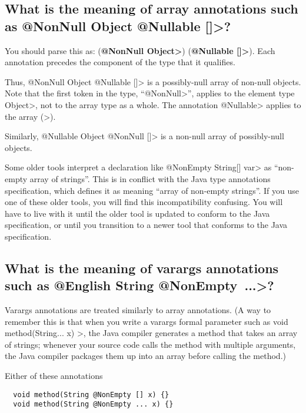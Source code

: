 \subsection{What is the meaning of array annotations such as \<@NonNull Object @Nullable []>?\label{faq-array-syntax-meaning}}

You should parse this as:
(\textbf{\<@NonNull Object>}) (\textbf{\<@Nullable []>}).
Each annotation precedes the component of the type that it qualifies.

Thus,
\<@NonNull Object @Nullable []> is a possibly-null array of non-null
objects.  Note that the first token in the type,
``\<@NonNull>'', applies to the element
type \<Object>, not to the array type as a whole.  The annotation \<@Nullable> applies to the
array (\<[]>).

Similarly,
\<@Nullable Object @NonNull []> is a non-null array of possibly-null
objects.


Some older tools interpret a declaration like \<@NonEmpty String[] var> as
``non-empty array of strings''.  This is in conflict with the Java type
annotations specification, which defines it as meaning ``array of
non-empty strings''.
If you use one of these
older tools, you will find this incompatibility confusing.
You will have to live with it until the older
tool is updated to conform to the Java specification, or until you
transition to a newer tool that conforms to the Java specification.


\subsection{What is the meaning of varargs annotations such as \<@English String @NonEmpty~...>?\label{faq-varargs-syntax-meaning}}

Varargs annotations are treated similarly to array annotations.
(A way to remember this is that
when you write a varargs formal parameter such as
\<void method(String... x) \ttlcb\ttrcb>, the Java compiler generates a
method that takes an array of strings; whenever your source code calls the
method with multiple arguments, the Java compiler packages them up into an
array before calling the method.)

Either of these annotations

\begin{Verbatim}
  void method(String @NonEmpty [] x) {}
  void method(String @NonEmpty ... x) {}
\end{Verbatim}

